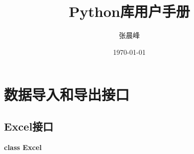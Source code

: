 \documentclass[UTF8,a4paper,10pt]{article}
\title{Python库用户手册}
\author{张晨峰}
\date{\today}
\begin{document}
\maketitle

\section{数据导入和导出接口}
\subsection{Excel接口}

\textbf{class Excel}
\end{document}
